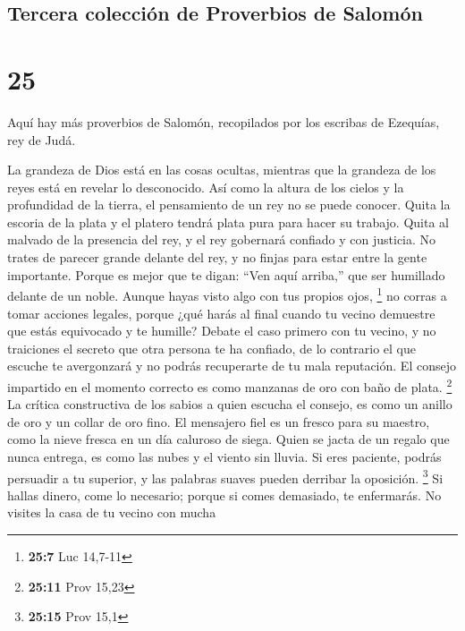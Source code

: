 \hypertarget{tercera-colecciuxf3n-de-proverbios-de-salomuxf3n}{%
\subsection{Tercera colección de Proverbios de
Salomón}\label{tercera-colecciuxf3n-de-proverbios-de-salomuxf3n}}

\hypertarget{section-24}{%
\section{25}\label{section-24}}

 Aquí hay más proverbios de Salomón, recopilados por los
escribas de Ezequías, rey de Judá.

 La grandeza de Dios está en las cosas ocultas, mientras que
la grandeza de los reyes está en revelar lo desconocido. 
Así como la altura de los cielos y la profundidad de la tierra, el
pensamiento de un rey no se puede conocer.  Quita la escoria
de la plata y el platero tendrá plata pura para hacer su trabajo.
 Quita al malvado de la presencia del rey, y el rey
gobernará confiado y con justicia.  No trates de parecer
grande delante del rey, y no finjas para estar entre la gente
importante.  Porque es mejor que te digan: ``Ven aquí
arriba,'' que ser humillado delante de un noble. Aunque hayas visto algo
con tus propios ojos, \footnote{\textbf{25:7} Luc 14,7-11} 
no corras a tomar acciones legales, porque ¿qué harás al final cuando tu
vecino demuestre que estás equivocado y te humille?  Debate
el caso primero con tu vecino, y no traiciones el secreto que otra
persona te ha confiado,  de lo contrario el que escuche te
avergonzará y no podrás recuperarte de tu mala reputación. 
El consejo impartido en el momento correcto es como manzanas de oro con
baño de plata. \footnote{\textbf{25:11} Prov 15,23}  La
crítica constructiva de los sabios a quien escucha el consejo, es como
un anillo de oro y un collar de oro fino.  El mensajero
fiel es un fresco para su maestro, como la nieve fresca en un día
caluroso de siega.  Quien se jacta de un regalo que nunca
entrega, es como las nubes y el viento sin lluvia.  Si eres
paciente, podrás persuadir a tu superior, y las palabras suaves pueden
derribar la oposición. \footnote{\textbf{25:15} Prov 15,1} 
Si hallas dinero, come lo necesario; porque si comes demasiado, te
enfermarás.  No visites la casa de tu vecino con mucha
